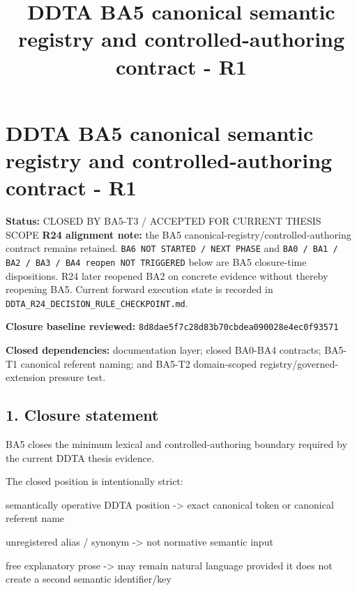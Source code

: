 \documentclass[
  10pt,
  a4paper,
]{article}
\title{DDTA BA5 canonical semantic registry and controlled-authoring
contract - R1}
\author{}
\date{}
\newenvironment{Shaded}{}{}
\newcommand{\NormalTok}[1]{#1}
\begin{document}
\maketitle

\section{DDTA BA5 canonical semantic registry and controlled-authoring
contract -
R1}\label{ddta-ba5-canonical-semantic-registry-and-controlled-authoring-contract---r1}

\textbf{Status:} CLOSED BY BA5-T3 / ACCEPTED FOR CURRENT THESIS SCOPE
\textbf{R24 alignment note:} the BA5 canonical-registry/controlled-authoring contract remains retained. \texttt{BA6 NOT STARTED / NEXT PHASE} and \texttt{BA0 / BA1 / BA2 / BA3 / BA4 reopen NOT TRIGGERED} below are BA5 closure-time dispositions. R24 later reopened BA2 on concrete evidence without thereby reopening BA5. Current forward execution state is recorded in \texttt{DDTA\_R24\_DECISION\_RULE\_CHECKPOINT.md}.


\textbf{Closure baseline reviewed:}
\texttt{8d8dae5f7c28d83b70cbdea090028e4ec0f93571}

\textbf{Closed dependencies:} documentation layer; closed BA0-BA4
contracts; BA5-T1 canonical referent naming; and BA5-T2 domain-scoped
registry/governed-extension pressure test.

\subsection{1. Closure statement}\label{1-closure-statement}

BA5 closes the minimum lexical and controlled-authoring boundary
required by the current DDTA thesis evidence.

The closed position is intentionally strict:

\begin{Shaded}
\begin{Highlighting}[]
\NormalTok{semantically operative DDTA position}
\NormalTok{    {-}\textgreater{} exact canonical token or canonical referent name}

\NormalTok{unregistered alias / synonym}
\NormalTok{    {-}\textgreater{} not normative semantic input}

\NormalTok{free explanatory prose}
\NormalTok{    {-}\textgreater{} may remain natural language}
\NormalTok{       provided it does not create a second semantic identifier/key}
\end{Highlighting}
\end{Shaded}
\end{document}
